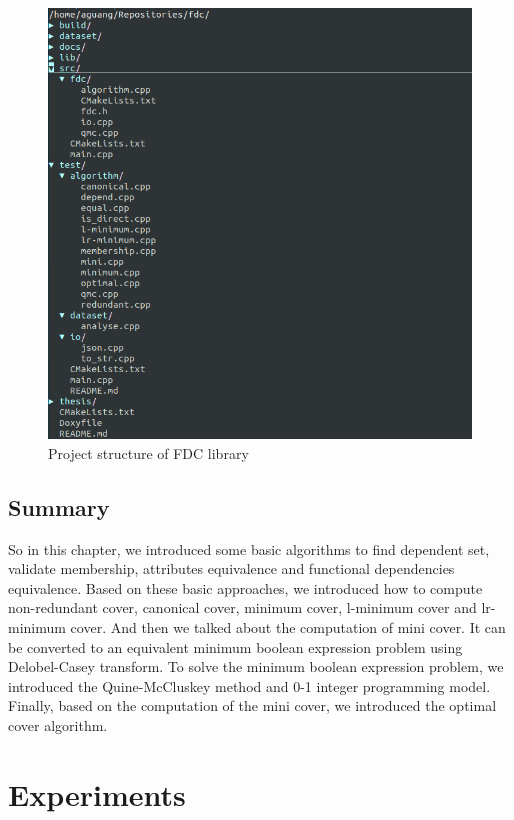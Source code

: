 \documentclass[11pt]{book}
\begin{document}
\begin{figure}
	\centering
	\includegraphics[width=\textwidth]{./diagrams/structure.png}
	\caption{Project structure of FDC library}
\end{figure}

\section{Summary}

So in this chapter, we introduced some basic algorithms to find dependent set, validate membership, attributes equivalence and functional dependencies equivalence. Based on these basic approaches, we introduced how to compute non-redundant cover, canonical cover, minimum cover, l-minimum cover and lr-minimum cover. And then we talked about the computation of mini cover. It can be converted to an equivalent minimum boolean expression problem using Delobel-Casey transform. To solve the minimum boolean expression problem, we introduced the Quine-McCluskey method and 0-1 integer programming model. Finally, based on the computation of the mini cover, we introduced the optimal cover algorithm.

\chapter{Experiments}
\end{document}

